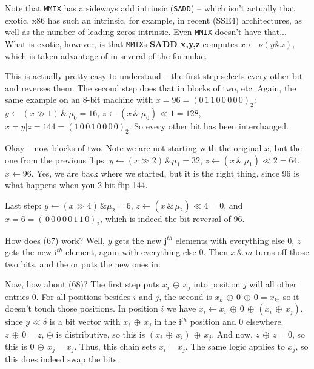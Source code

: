 \vskip 0.1in 

\noindent [p 143] Note that {\tt MMIX} has a sideways add intrinsic
({\tt SADD}) -- which isn't actually that exotic.  x86 has such an intrinsic,
for example, in recent (SSE4) architectures, as well as the number of
leading zeros intrinsic.  Even {\tt MMIX} doesn't have that...  What
is exotic, however, is that {\tt MMIX}s {\bf SADD x,y,z}
computes $x \gets \nu \! \left(y \& \bar{z}\right)$, which is
taken advantage of in several of the formulae.

\vskip 0.1in 

\noindent [p 144] 
This is actually pretty easy to understand -- the
first step selects every other bit and reverses them.
The second step does that in blocks of two, etc.
Again, the same example on an 8-bit machine
with $x = 96 = \left(0\,1\,1\,0\,0\,0\,0\,0\right)_2$:
$y \gets \left(x \gg 1\right) \, \& \, \mu_0 = 16$,
$z \gets \left(x \, \& \, \mu_0\right) \ll 1 = 128$,
$x = y | z = 144 = \left(1\,0\,0\,1\,0\,0\,0\,0\right)_2$.
So every other bit has been interchanged.

Okay -- now blocks of two.  Note we are
not starting with the original $x$, but the one
from the previous flips.
$y \gets \left(x \gg 2\right) \, \& \mu_1 = 32$,
$z \gets \left(x \, \& \, \mu_1\right) \ll 2 = 64$.
$x \gets 96$.  Yes, we are back where we started,
but it is the right thing, since 96 is what happens when
you 2-bit flip 144.  

Last step: $y \gets \left(x \gg 4\right) \, \& \mu_2 = 6$,
$z \gets \left(x \, \& \, \mu_2\right) \ll 4 = 0$,
and $x = 6 = \left(\,0\,0\,0\,0\,0\,1\,1\,0\right)_2$,
which is indeed the bit reversal of 96.

\break

\vskip 0.1in 
\noindent [p 144] How does (67) work?\hfil\break
Well, $y$ gets the new j$^{th}$ elements with everything
else 0, $z$ gets the new i$^{th}$ element, again with
everything else 0.  Then $x \, \& \, m$ turns off those two
bits, and the or puts the new ones in.

\vskip 0.08in \noindent [p 145] Now, how about (68)?\hfil\break
The first step puts $x_i \, \oplus \, x_j$ into position $j$ will all
other entries 0.  For all positions besides $i$ and $j$, the second
is $x_k \, \oplus \, 0 \, \oplus \, 0 = x_k$, so it doesn't touch those
positions.  In position $i$ we have $x_i \gets x_i \, \oplus \, 0 \, \oplus \,
\left(x_i \, \oplus \, x_j\right)$, since $y \ll \delta$ is a bit vector
with $x_i \, \oplus \, x_j$ in the i$^{th}$ position and 0 elsewhere.
$z \, \oplus \, 0 = z$, $\oplus$ is distributive, so this is
$\left(x_i \, \oplus \, x_i\right) \, \oplus \, x_j$.  And now, 
$z \, \oplus \, z = 0$, so this is $0 \, \oplus \, x_j = x_j$.
Thus, this chain sets $x_i = x_j$.  The same logic applies
to $x_j$, so this does indeed swap the bits.

